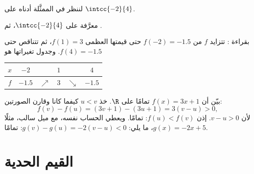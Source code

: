 \begin{example}\label{ex:g10:functions:table}
لننظر في  الممثَّلة أدناه على $\intcc{-2}{4}$.

\begin{omfigure}

{\small {} معرَّفة على $\intcc{-2}{4}$،  ثم .}
\end{omfigure}

بقراءة : تتزايد $f$ من $f(-2) = -1.5$ حتى قيمتها العظمى
$f(1) = 3$، ثم تتناقص حتى $f(4) = -1.5$. وجدول تغيراتها هو
\begin{center}
\renewcommand{\arraystretch}{1.3}
\begin{tabular}{c|ccccc}
$x$ & $-2$ & & $1$ & & $4$ \\
\hline
$f$ & $-1.5$ & $\nearrow$ & $3$ & $\searrow$ & $-1.5$ \\
\end{tabular}
\end{center}
\end{example}

\begin{example}\label{ex:g10:functions:proof}
بيّن أن $f(x) = 3x + 1$  تمامًا على $\R$. خذ $u < v$
كيفما كانا وقارن الصورتين:
\[
f(v) - f(u) = (3v + 1) - (3u + 1) = 3(v - u) > 0,
\]
لأن $v - u > 0$. إذن $f(u) < f(v)$: 
تمامًا. ويعطي الحساب نفسه، مع ميل سالب، مثلًا
$g(x) = -2x + 5$، ما يلي: $g(v) - g(u) = -2(v-u) < 0$:  تمامًا.
\end{example}

\section{القيم الحدية}

